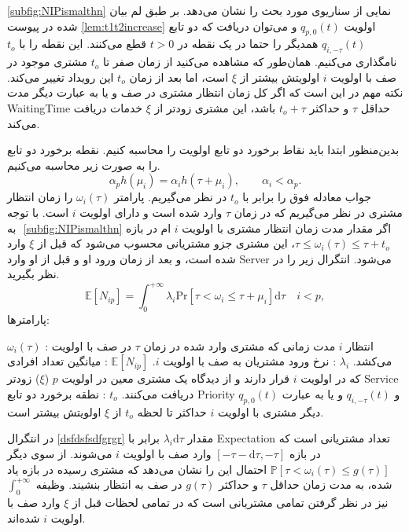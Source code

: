 ‎\autoref{subfig:NIPismalthn}‎ 
نمایی از سناریوی مورد بحث را نشان می‌دهد. بر طبق لم بیان شده در پیوست ‎\ref{lem:t1t2increase}‎ می‌توان دریافت که دو تابع ‎‎اولویت
 $q_{p,0}(t)$ و $q_{i,-\tau}(t)$ 
 همدیگر را حتما در یک نقطه در $t>0$ قطع می‌کنند. این نقطه را با $t_{o}$ نامگذاری می‌کنیم. همان‌طور که مشاهده می‌کنید از زمان صفر تا $t_{o}$ مشتری موجود در صف با اولویت $i$ اولویتش بیشتر از $‎\xi$ است، اما بعد از زمان $t_{o}$ این رویداد تغییر می‌کند. نکته مهم در این است که اگر کل زمان انتظار مشتری در صف و یا به عبارت دیگر مدت ‎\gls{WaitingTime}‎ حداقل $‎\tau$ و حداکثر 
$t_{o} + \tau$
باشد، این مشتری زودتر از $‎\xi$ خدمات دریافت می‌کند.



بدین‌منظور ابتدا باید نقاط برخورد دو تابع اولویت را محاسبه کنیم. نقطه برخورد دو تابع را به صورت زیر محاسبه می‌کنیم.
\begin{equation}
\alpha_{p}h(\mu_i) = \alpha_{i}h(\tau+\mu_{i}),\quad\quad \alpha_i<\alpha_p.
\label{eq:kadkoddd}
\end{equation}
جواب معادله فوق را برابر با  $t_{o}$ در نظر می‌گیریم. پارامتر 
$\omega_{i}(\tau)$
را زمان انتظار مشتری در نظر می‌گیریم که  در زمان $‎‎\tau$ وارد شده است و دارای اولویت $i$ است. با توجه به ‎
‎\autoref{subfig:NIPismalthn}‎ 
 اگر مقدار مدت زمان انتظار مشتری با اولویت $i$ ام در بازه
$\tau \leq \omega_{i}(\tau)\leq \tau+ t_{o}$، 
این مشتری جزو مشتریانی محسوب می‌شود که قبل از $‎\xi$ وارد شده است، و بعد از زمان ورود او و قبل از او وارد ‎\gls{Server}‎ می‌شود. انتگرال زیر را در نظر بگیرید.
\begin{equation}
\mathbb{E}[N_{ip}] = \int_{0}^{+\infty} \lambda_{i}\mathrm{Pr}[\tau<\omega_{i}\leq \tau+\mu_i]\mathrm{d}\tau \quad i< p,
\label{dsfdsfsdfgrgr}
\end{equation}
پارامترها:
\begin{itemize}
\tree $\omega_{i}(\tau)$ :
مدت زمانی که مشتری وارد شده در زمان  $‎\tau$ در صف با اولویت ‎$i$ انتظار می‌کشد. 
\tree $\lambda_{i}$ :
نرخ ورود مشتریان به صف با اولویت $i$.
\tree $\mathbb{E}[N_{ip}]$ :
میانگین تعداد افرادی که در اولویت $i$ قرار دارند و از دیدگاه یک مشتری معین در اولویت $p$ 
($\xi$)
زودتر ‎\gls{Service}‎ دریافت می‌کنند.
\tree $t_{o}$ :
نطقه برخورد دو تابع ‎\gls{Priority}‎
$q_{p,0}(t)$ و $q_{i,-\tau}(t)$
و یا به عبارت دیگر مشتری با اولویت $i$ حداکثر تا لحظه $t_{o}$ از $‎\xi$ اولویتش بیشتر است.
\end{itemize}
در انتگرال  ‎‎\ref{dsfdsfsdfgrgr}‎ مقدار 
$\lambda_{i}\mathrm{d}\tau$
برابر با ‎\gls{Expectation}‎ تعداد مشتریانی است که در بازه 
$[-\tau-\mathrm{d}\tau , -\tau]$
وارد صف با اولویت $i$ می‌شوند. از سوی دیگر 
$\mathbb{P}[\tau<\omega_{i}(\tau)\leq g(\tau)]$
احتمال این را نشان می‌دهد که مشتری رسیده در بازه یاد شده، به مدت زمان حداقل $‎\tau$ و حداکثر $g(‎\tau)$ در صف به انتظار بنشیند. وظیفه 
$\int_{0}^{+\infty}$
نیز در نظر گرفتن تمامی مشتریانی است که در تمامی لحظات قبل از $‎\xi$ وارد صف با اولویت $i$ شده‌اند. 

